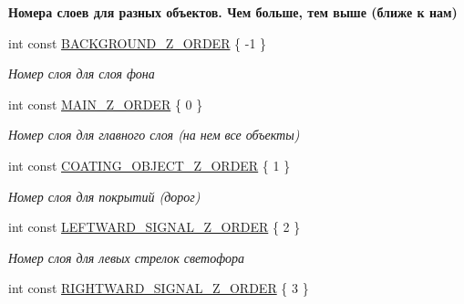 \begin{Indent}\textbf{ Номера слоев для разных объектов. Чем больше, тем выше (ближе к нам)}\par
\begin{DoxyCompactItemize}
\item 
\mbox{\label{namespacertm_a7f35c0f618542e0c894a24be01f91878}} 
int const \hyperlink{namespacertm_a7f35c0f618542e0c894a24be01f91878}{B\+A\+C\+K\+G\+R\+O\+U\+N\+D\+\_\+\+Z\+\_\+\+O\+R\+D\+ER} \{ -\/1 \}
\begin{DoxyCompactList}\small\item\em Номер слоя для слоя фона \end{DoxyCompactList}\item 
\mbox{\label{namespacertm_a5d09d134857a2876fb1b43d255bf1d0d}} 
int const \hyperlink{namespacertm_a5d09d134857a2876fb1b43d255bf1d0d}{M\+A\+I\+N\+\_\+\+Z\+\_\+\+O\+R\+D\+ER} \{ 0 \}
\begin{DoxyCompactList}\small\item\em Номер слоя для главного слоя (на нем все объекты) \end{DoxyCompactList}\item 
\mbox{\label{namespacertm_a85a3b25dc036bde14f8874ebf9ef9cd2}} 
int const \hyperlink{namespacertm_a85a3b25dc036bde14f8874ebf9ef9cd2}{C\+O\+A\+T\+I\+N\+G\+\_\+\+O\+B\+J\+E\+C\+T\+\_\+\+Z\+\_\+\+O\+R\+D\+ER} \{ 1 \}
\begin{DoxyCompactList}\small\item\em Номер слоя для покрытий (дорог) \end{DoxyCompactList}\item 
\mbox{\label{namespacertm_ab06d47a1908b0e155bed9d703b2530dd}} 
int const \hyperlink{namespacertm_ab06d47a1908b0e155bed9d703b2530dd}{L\+E\+F\+T\+W\+A\+R\+D\+\_\+\+S\+I\+G\+N\+A\+L\+\_\+\+Z\+\_\+\+O\+R\+D\+ER} \{ 2 \}
\begin{DoxyCompactList}\small\item\em Номер слоя для левых стрелок светофора \end{DoxyCompactList}\item 
\mbox{\label{namespacertm_aa0a20b2a0c93ed1bcefafabde4a16f29}} 
int const \hyperlink{namespacertm_aa0a20b2a0c93ed1bcefafabde4a16f29}{R\+I\+G\+H\+T\+W\+A\+R\+D\+\_\+\+S\+I\+G\+N\+A\+L\+\_\+\+Z\+\_\+\+O\+R\+D\+ER} \{ 3 \}

\end{DoxyCompactItemize}
\end{Indent}

